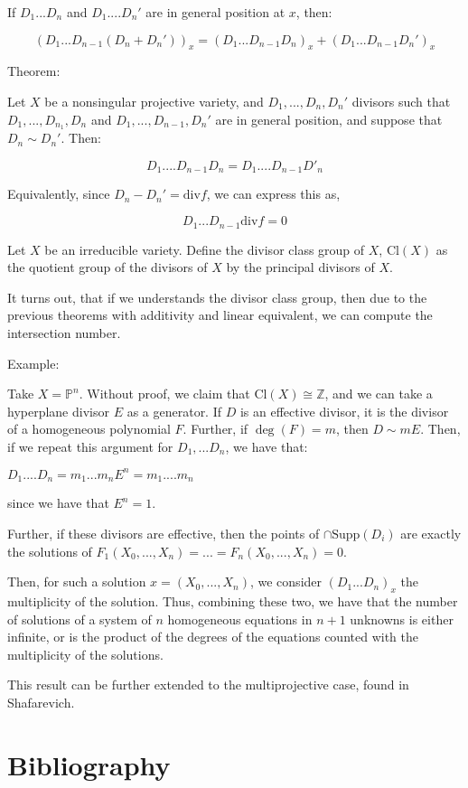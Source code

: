 \documentclass[10pt]{article}
\begin{document}
If $D_1...D_n$ and $D_1....D_n'$ are in general position at $x$, then:

$$ (D_1...D_{n-1}(D_n + D_n'))_x = (D_1...D_{n-1}D_n)_x + (D_1...D_{n-1}D_n')_x $$

Theorem:

Let $X$ be a nonsingular projective variety, and $D_1,...,D_n,D_n'$ divisors such that $D_1,...,D_{n_1},D_n$ and $D_1,...,D_{n-1},D_n'$ are in general position, and suppose that $D_n \sim D_n'$. Then:

$$ D_1....D_{n-1}D_n = D_1....D_{n-1}D'_n$$

Equivalently, since $D_n - D_n' = \text{div}f$, we can express this as,

$$D_1...D_{n-1}\text{div} f = 0$$

Let $X$ be an irreducible variety. Define the divisor class group of $X$, $\text{Cl}(X)$ as the quotient group of the divisors of $X$ by the principal divisors of $X$.

It turns out, that if we understands the divisor class group, then due to the previous theorems with additivity and linear equivalent, we can compute the intersection number.

Example:

Take $X = \mathbb{P}^n$. Without proof, we claim that $\text{Cl}(X) \cong \mathbb{Z}$, and we can take a hyperplane divisor $E$ as a generator. If $D$ is an effective divisor, it is the divisor of a homogeneous polynomial $F$. Further, if $\deg(F) = m$, then $D \sim mE$. Then, if we repeat this argument for $D_1,...D_n$, we have that:

$D_1....D_n = m_1...m_nE^n = m_1....m_n$

since we have that $E^n = 1$.

Further, if these divisors are effective, then the points of $\cap \text{Supp}(D_i)$ are exactly the solutions of $F_1(X_0,...,X_n) = ... = F_n(X_0,...,X_n) = 0$.

Then, for such a solution $x = (X_0,...,X_n)$, we consider $(D_1...D_n)_x$ the multiplicity of the solution. Thus, combining these two, we have that the number of solutions of a system of $n$ homogeneous equations in $n+1$ unknowns is either infinite, or is the product of the degrees of the equations counted with the multiplicity of the solutions.

This result can be further extended to the multiprojective case, found in Shafarevich.

\section{Bibliography}
\end{document}
